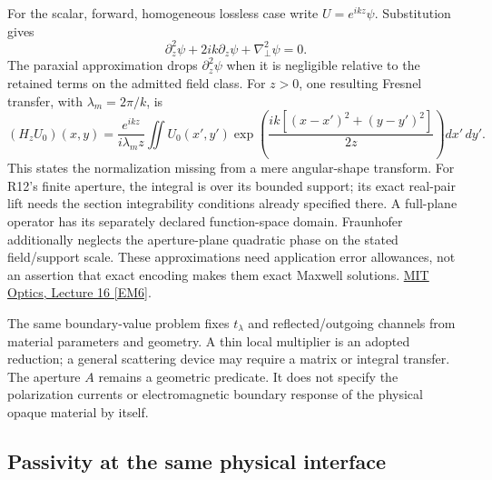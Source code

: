 For the scalar, forward, homogeneous lossless case write $U=e^{ikz}\psi$.
Substitution gives
\begin{equation}
 \partial_z^2\psi+2ik\partial_z\psi+\nabla_\perp^2\psi=0.
 \label{eq:r13-em-paraxial-exact}
\end{equation}
The paraxial approximation drops $\partial_z^2\psi$ when it is negligible
relative to the retained terms on the admitted field class. For $z>0$, one
resulting Fresnel transfer, with $\lambda_m=2\pi/k$, is
\begin{equation}
 (H_zU_0)(x,y)=\frac{e^{ikz}}{i\lambda_m z}
 \iint U_0(x',y')
 \exp\!\left(\frac{ik[(x-x')^2+(y-y')^2]}{2z}\right)dx'\,dy'.
 \label{eq:r13-em-fresnel}
\end{equation}
This states the normalization missing from a mere angular-shape transform.
For R12's finite aperture, the integral is over its bounded support; its exact
real-pair lift needs the section integrability conditions already specified
there. A full-plane operator has its separately declared function-space
domain. Fraunhofer additionally neglects the aperture-plane quadratic phase
on the stated field/support scale. These approximations need application
error allowances, not an assertion that exact encoding makes them exact
Maxwell solutions.
\href{https://ocw.mit.edu/courses/2-71-optics-spring-2014/4b53a5747f9b58b9b73b2bbcc39945f0_MIT2_71S14_lec16_notes.pdf}{MIT Optics, Lecture 16 [EM6]}.

The same boundary-value problem fixes $t_\lambda$ and reflected/outgoing
channels from material parameters and geometry. A thin local multiplier is
an adopted reduction; a general scattering device may require a matrix or
integral transfer. The aperture $A$ remains a geometric predicate. It does
not specify the polarization currents or electromagnetic boundary response
of the physical opaque material by itself.

\subsection{Passivity at the same physical interface}
\label{sec:r13-em-passivity}

